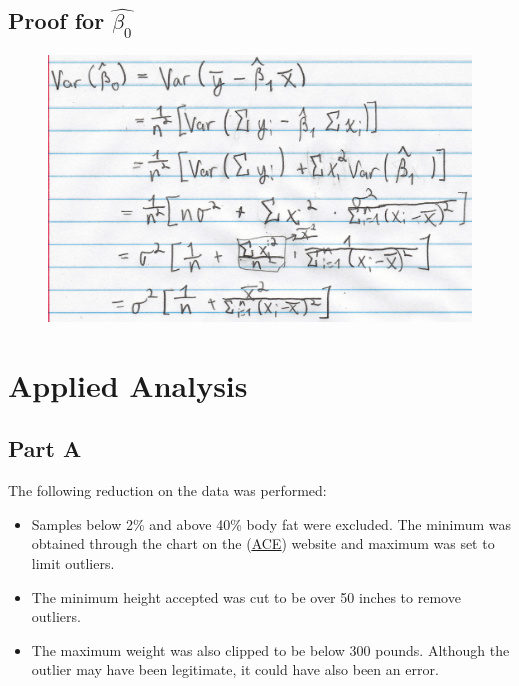 \documentclass[a4paper, 11pt]{article}
\begin{document}
\subsection*{Proof for $\hat{\beta_0}$}
\begin{figure}[H]
	\centering
	\includegraphics[width=.6\textwidth]{p2-2.jpg}
\end{figure}



\section*{Applied Analysis}
\subsection*{Part A}
The following reduction on the data was performed:
\begin{itemize}
	\item Samples below 2\% and above 40\% body fat were excluded. The minimum was obtained through the chart on the (\href{''https://www.acefitness.org/acefit/healthy-living-article/60/112/what-are-the-guidelines-for-percentage-of-body-fat-loss''}{\underline{ACE}}) website and maximum was set to limit outliers.
	\item The minimum height accepted was cut to be over 50 inches to remove outliers.
	\item The maximum weight was also clipped to be below 300 pounds. Although the outlier may have been legitimate, it could have also been an error.
\end{itemize}
\end{document}
